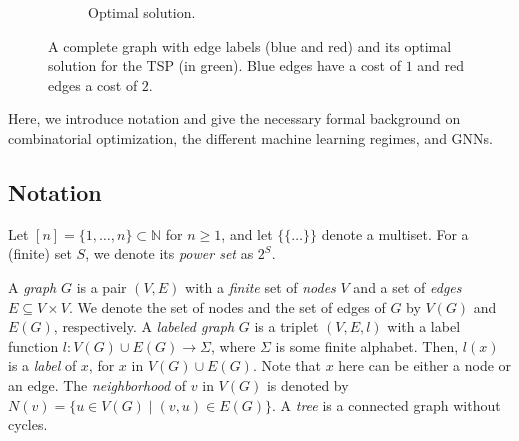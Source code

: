 \documentclass[twoside,11pt]{article}
\newcommand{\new}[1]{\emph{#1}}
\newcommand{\NN}{\mathbb{N}}
\begin{document}
\begin{figure}
\begin{subfigure}[t]{2in}
		\caption{Optimal solution.}

	\end{subfigure}

	\caption{A complete graph with edge labels (blue and red) and its optimal solution for the TSP (in green). Blue edges have a cost of $1$ and red edges a cost of $2$.}\label{fig:tsp}

\end{figure}

Here, we introduce notation and give the necessary formal background on combinatorial optimization, the different machine learning regimes, and GNNs.

\subsection{Notation}

Let $[n] = \{ 1, \dotsc, n \} \subset \NN$ for $n \geq 1$, and let $\{\!\!\{ \dots\}\!\!\}$ denote a multiset. For a (finite) set $S$, we denote its \new{power set} as $2^S$.

A \new{graph} $G$ is a pair $(V,E)$ with a \emph{finite} set of
\new{nodes} $V$ and a set of \new{edges} $E \subseteq V\times V$.
We denote the set of nodes and the set
of edges of $G$ by $V(G)$ and $E(G)$, respectively.
A \new{labeled graph} $G$ is a triplet
$(V,E,l)$ with a label function $l \colon V(G) \cup E(G) \to \Sigma$,
where $\Sigma$ is some finite alphabet. Then, $l(x)$ is a
\new{label} of $x$, for $x$ in $V(G) \cup E(G)$. Note that $x$ here can be either a node or an edge.
The \new{neighborhood}
of $v$ in $V(G)$ is denoted by $N(v) = \{ u \in V(G) \mid (v, u) \in E(G) \}$.
A \new{tree} is a connected graph without
cycles.
\end{document}
